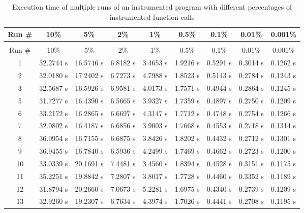\begin{landscape}
  \begin{longtable}{cllllllll}
    \caption{Execution time of multiple runs of an instrumented program with different percentages of instrumented function calls}\\
    Run \# & \multicolumn{1}{c}{10\%} & \multicolumn{1}{c}{5\%} & \multicolumn{1}{c}{2\%} & \multicolumn{1}{c}{1\%} & \multicolumn{1}{c}{0.5\%} & \multicolumn{1}{c}{0.1\%} & \multicolumn{1}{c}{0.01\%} & \multicolumn{1}{c}{0.001\%} \\\hline
    \endfirsthead
    \caption[]{Execution time of multiple runs of an instrumented program with different percentages of instrumented function calls}\\
    Run \# & \multicolumn{1}{c}{10\%} & \multicolumn{1}{c}{5\%} & \multicolumn{1}{c}{2\%} & \multicolumn{1}{c}{1\%} & \multicolumn{1}{c}{0.5\%} & \multicolumn{1}{c}{0.1\%} & \multicolumn{1}{c}{0.01\%} & \multicolumn{1}{c}{0.001\%} \\\hline
    \endhead
    1 & 32.2744 s& 16.5746 s& 6.8182 s& 3.4653 s& 1.9216 s& 0.5291 s& 0.3014 s& 0.1262 s\\
    2 & 32.0180 s& 17.2402 s& 6.7273 s& 4.7988 s& 1.8523 s& 0.5143 s& 0.2784 s& 0.1243 s\\
    3 & 32.5687 s& 16.5926 s& 6.9581 s& 4.0173 s  & 1.7571 s& 0.4944 s& 0.2864 s& 0.1245 s\\
    5 & 31.7277 s& 16.4390 s& 6.5665 s& 3.9327 s& 1.7359 s& 0.4897 s& 0.2750 s& 0.1209 s\\
    6 & 33.2172 s & 16.2865 s& 6.6697 s& 4.3147 s & 1.7712 s& 0.4748 s& 0.2754 s& 0.1266 s\\
    7 & 32.0802 s& 16.4187 s& 6.6856 s& 3.9003 s& 1.7668 s& 0.4553 s& 0.2718 s& 0.1314 s\\
    8 & 36.0954 s& 16.7155 s& 6.6875 s& 3.8426 s& 1.8202 s& 0.4432 s& 0.2712 s& 0.1301 s\\
    9 & 36.9455 s& 16.7840 s& 6.5936 s& 4.2499 s& 1.7469 s& 0.4662 s& 0.2723 s & 0.1200 s\\
    10 &33.0339 s& 20.1691 s & 7.4481 s  & 3.4560 s& 1.8394 s& 0.4528 s& 0.3151 s& 0.1175 s\\
    11 &35.2251 s& 19.8842 s& 7.2807 s& 3.8017 s& 1.7728 s& 0.4460 s& 0.3352 s & 0.1189 s\\
    12 &31.8794 s& 20.2660 s& 7.0673 s & 5.2281 s& 1.6975 s& 0.4340 s& 0.2739 s& 0.1209 s \\
    13 &32.9260 s & 19.2307 s  & 6.7634 s& 4.3974 s& 1.7026 s & 0.4441 s& 0.2708 s& 0.1195 s\\

\end{longtable}
\end{landscape}
